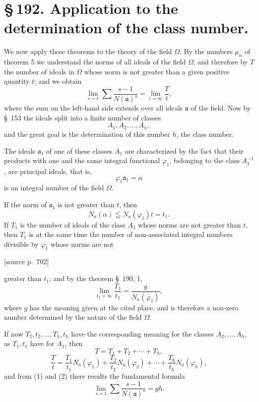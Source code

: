 \documentclass[11pt]{article}
\newcommand{\srcpage}[1]{\par\medskip\noindent\textsf{[source p.~#1]}\par\smallskip}
\begin{document}
\section*{\S\,192. Application to the determination of the class number.}

We now apply these theorems to the theory of the field $\Omega$. By the numbers $\mu_n$ of theorem 5 we understand the norms of all ideals of the field $\Omega$, and therefore by $T$ the number of ideals in $\Omega$ whose norm is not greater than a given positive quantity $t$; and we obtain
\begin{equation}
\lim_{s=1}\sum\frac{s-1}{N(\mathfrak a)^s}=\lim_{t=\infty}\frac{T}{t},
\tag{1}
\end{equation}
where the sum on the left-hand side extends over all ideals $\mathfrak a$ of the field. Now by \S~153 the ideals split into a finite number of classes
\[
A_1,A_2,\ldots,A_h,
\]
and the great goal is the determination of this number $h$, the class number.

The ideals $\mathfrak a_1$ of one of these classes $A_1$ are characterized by the fact that their products with one and the same integral functional $\varphi_1$, belonging to the class $A_1^{-1}$, are principal ideals, that is,
\[
\varphi_1\mathfrak a_1=\alpha
\]
is an integral number of the field $\Omega$.

If the norm of $\mathfrak a_1$ is not greater than $t$, then
\[
N_a(\alpha)\leqq N_a(\varphi_1)t=t_1.
\]
If $T_1$ is the number of ideals of the class $A_1$ whose norms are not greater than $t$, then $T_1$ is at the same time the number of non-associated integral numbers divisible by $\varphi_1$ whose norms are not

\srcpage{702}
greater than $t_1$; and by the theorem \S~190, 1,
\begin{equation}
\lim_{t_1=\infty}\frac{T_1}{t_1}=\frac{g}{N_a(\varphi_1)},
\tag{2}
\end{equation}
where $g$ has the meaning given at the cited place, and is therefore a non-zero number determined by the nature of the field $\Omega$.

If now $T_2,t_2,\ldots,T_h,t_h$ have the corresponding meaning for the classes $A_2,\ldots,A_h$, as $T_1,t_1$ have for $A_1$, then
\[
T=T_1+T_2+\cdots+T_h,
\]
\[
\frac{T}{t}=\frac{T_1}{t_1}N_a(\varphi_1)+\frac{T_2}{t_2}N_a(\varphi_2)+\cdots+
\frac{T_h}{t_h}N_a(\varphi_h),
\]
and from (1) and (2) there results the fundamental formula
\begin{equation}
\lim_{s=1}\sum\frac{s-1}{N(\mathfrak a)^s}=gh.
\tag{3}
\end{equation}
\end{document}
